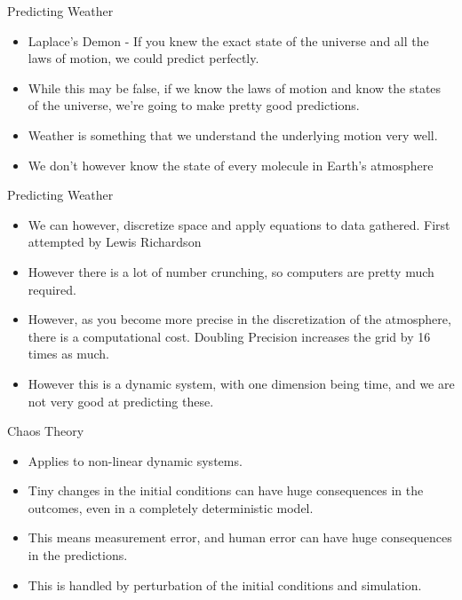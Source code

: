 \documentclass[bigger]{beamer}
\begin{document}
\begin{frame}[label=sec-2-4-1]{Predicting Weather}
\begin{itemize}
\item Laplace's Demon - If you knew the exact state of the universe and
all the laws of motion, we could predict perfectly.
\item While this may be false, if we know the laws of motion and know the
states of the universe, we're going to make pretty good predictions.
\item Weather is something that we understand the underlying motion very well.
\item We don't however know the state of every molecule in Earth's atmosphere
\end{itemize}
\end{frame}

\begin{frame}[label=sec-2-4-2]{Predicting Weather}
\begin{itemize}
\item We can however, discretize space and apply equations to data
gathered. First attempted by Lewis Richardson
\item However there is a lot of number crunching, so computers are pretty
much required.
\item However, as you become more precise in the discretization of the
atmosphere, there is a computational cost. Doubling Precision
increases the grid by 16 times as much.
\item However this is a dynamic system, with one dimension being time, and
we are not very good at predicting these.
\end{itemize}
\end{frame}

\begin{frame}[label=sec-2-4-3]{Chaos Theory}
\begin{itemize}
\item Applies to non-linear dynamic systems.
\item Tiny changes in the initial conditions can have huge consequences in
the outcomes, even in a completely deterministic model.
\item This means measurement error, and human error can have huge
consequences in the predictions.
\item This is handled by perturbation of the initial conditions and simulation.
\end{itemize}
\end{frame}
\end{document}
